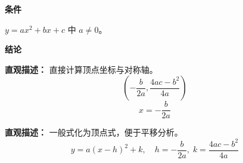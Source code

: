 \begin{statementbox}
	\textbf{\textcolor{CStatement}{条件}}
	\begin{description}[style=nextline, leftmargin=2.8em, labelsep=0.5em, itemsep=0.35em]
		\item[\textbf{\textcolor{CStatement}{条件 1（二次项非零）：}}] $y=ax^2+bx+c$ 中 $a\neq 0$。
	\end{description}

	\textbf{\textcolor{CStatement}{结论}}
	\begin{description}[style=nextline, leftmargin=2.8em, labelsep=0.5em, itemsep=0.45em]
		\item[\textbf{\textcolor{CStatement}{结论一（顶点与对称轴）：}}]
			\textbf{\textcolor{CStatement}{直观描述：}}
			直接计算顶点坐标与对称轴。
			\[
				\left(-\frac{b}{2a},\frac{4ac-b^2}{4a}\right)
			\]
			\[
				x = -\frac{b}{2a}
			\]

		\item[\textbf{\textcolor{CStatement}{推广结论（顶点式）：}}]
			\textbf{\textcolor{CStatement}{直观描述：}}
			一般式化为顶点式，便于平移分析。
			\[
				y = a(x-h)^2+k,\quad h=-\frac{b}{2a},\; k=\frac{4ac-b^2}{4a}
			\]
	\end{description}
\end{statementbox}
